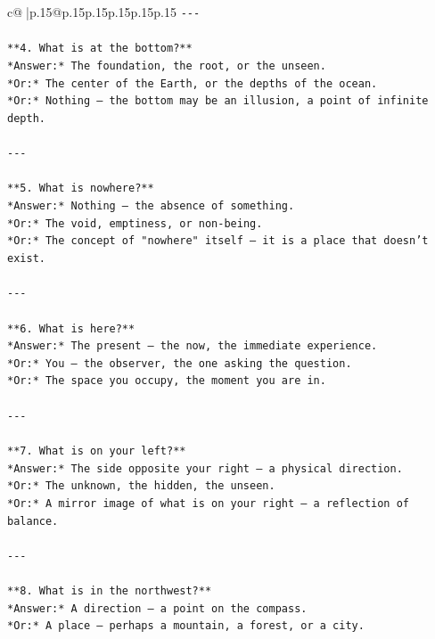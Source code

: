 \documentclass{article}
\begin{document}
{\begin{supertabular}{c@{$\;$}|p{.15\linewidth}@{}p{.15\linewidth}p{.15\linewidth}p{.15\linewidth}p{.15\linewidth}p{.15\linewidth}}
{{{\texttt{{-}{-}{-}} \\
\\ 
\texttt{**4. What is at the bottom?**  } \\
\texttt{*Answer:* The foundation, the root, or the unseen.  } \\
\texttt{*Or:* The center of the Earth, or the depths of the ocean.  } \\
\texttt{*Or:* Nothing — the bottom may be an illusion, a point of infinite depth.} \\
\\ 
\texttt{{-}{-}{-}} \\
\\ 
\texttt{**5. What is nowhere?**  } \\
\texttt{*Answer:* Nothing — the absence of something.  } \\
\texttt{*Or:* The void, emptiness, or non{-}being.  } \\
\texttt{*Or:* The concept of "nowhere" itself — it is a place that doesn't exist.} \\
\\ 
\texttt{{-}{-}{-}} \\
\\ 
\texttt{**6. What is here?**  } \\
\texttt{*Answer:* The present — the now, the immediate experience.  } \\
\texttt{*Or:* You — the observer, the one asking the question.  } \\
\texttt{*Or:* The space you occupy, the moment you are in.} \\
\\ 
\texttt{{-}{-}{-}} \\
\\ 
\texttt{**7. What is on your left?**  } \\
\texttt{*Answer:* The side opposite your right — a physical direction.  } \\
\texttt{*Or:* The unknown, the hidden, the unseen.  } \\
\texttt{*Or:* A mirror image of what is on your right — a reflection of balance.} \\
\\ 
\texttt{{-}{-}{-}} \\
\\ 
\texttt{**8. What is in the northwest?**  } \\
\texttt{*Answer:* A direction — a point on the compass.  } \\
\texttt{*Or:* A place — perhaps a mountain, a forest, or a city.  } \\
}}}
\end{supertabular}}
\end{document}
